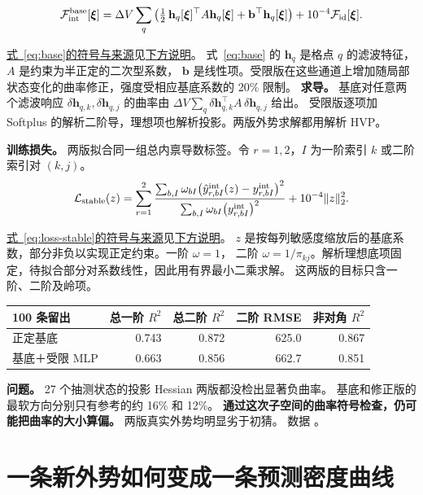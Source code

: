 \documentclass[UTF8,fontset=fandol,11pt]{ctexart}
\newcommand{\xiF}{\bm\xi}
\newcommand{\Id}{\mathcal F_{\mathrm{id}}}
\newcommand{\Int}{\mathcal F_{\mathrm{int}}}
\newcommand{\fref}[2]{\par{\footnotesize \hyperref[#1]{式~\ref{#1}的符号与来源}见\hyperref[#2]{下方说明}。}}
\newcommand{\defat}[1]{\phantomsection\label{#1}}
\begin{document}
\begin{equation}
\Int^{\rm base}[\xiF]
=\Delta V\sum_q\left(\tfrac12\,\mathbf h_q[\xiF]^\top A\mathbf h_q[\xiF]+\mathbf b^\top\mathbf h_q[\xiF]\right)
+10^{-4}\Id[\xiF].
\label{eq:base}
\end{equation}
\fref{eq:base}{def:base}
\defat{def:base}
式~\ref{eq:base} 的 \(\mathbf h_q\) 是格点 \(q\) 的滤波特征，\(A\) 是约束为半正定的二次型系数，
\(\mathbf b\) 是线性项。受限版在这些通道上增加随局部状态变化的曲率修正，强度受相应基底系数的 20\% 限制。
\textbf{求导。} 基底对任意两个滤波响应 $\delta\mathbf h_{q,k},\delta\mathbf h_{q,j}$ 的曲率由
$\Delta V\sum_q\delta\mathbf h_{q,k}^{\top}A\,\delta\mathbf h_{q,j}$ 给出。
受限版逐项加 Softplus 的解析二阶导，理想项也解析投影。两版外势求解都用解析 HVP。

\textbf{训练损失。} 两版拟合同一组总内禀导数标签。令 $r=1,2$，$I$ 为一阶索引 $k$ 或二阶索引对 $(k,j)$。
\begin{equation}
\mathcal L_{\rm stable}(z)=
 \sum_{r=1}^{2}
 \frac{\sum_{b,I}\omega_{bI}\bigl(\hat y^{\rm int}_{r,bI}(z)-y^{\rm int}_{r,bI}\bigr)^2}
      {\sum_{b,I}\omega_{bI}\bigl(y^{\rm int}_{r,bI}\bigr)^2}
 +10^{-4}\|z\|_2^2 .
 \label{eq:loss-stable}
\end{equation}
\fref{eq:loss-stable}{def:loss-stable}
\defat{def:loss-stable}
$z$ 是按每列敏感度缩放后的基底系数，部分非负以实现正定约束。一阶 $\omega=1$，
二阶 $\omega=1/\pi_{kj}$。解析理想底项固定，待拟合部分对系数线性，因此用有界最小二乘求解。
这两版的目标只含一阶、二阶及岭项。

\begin{center}\small
\begin{tabular}{lrrrr}\toprule
100 条留出 & 总一阶 \(R^2\) & 总二阶 \(R^2\) & 二阶 RMSE & 非对角 \(R^2\)\\
\midrule
正定基底 & 0.743 & 0.872 & 625.0 & 0.867\\
基底＋受限 MLP & 0.663 & 0.856 & 662.7 & 0.851\\
\bottomrule
\end{tabular}
\end{center}
\textbf{\color{warm}问题。} 27 个抽测状态的投影 Hessian 两版都没检出显著负曲率。
基底和修正版的最软方向分别只有参考的约 16\% 和 12\%。
\textbf{通过这次子空间的曲率符号检查，仍可能把曲率的大小算偏。} 两版真实外势均明显劣于初猜。
{\footnotesize 数据 。}

\clearpage
\section{一条新外势如何变成一条预测密度曲线}\label{sec:iterate}
\end{document}
